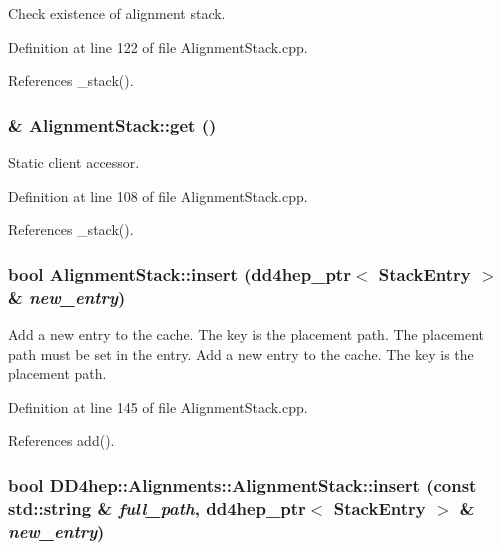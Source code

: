 Check existence of alignment stack. 

Definition at line 122 of file AlignmentStack.cpp.

References \_\-stack().\hypertarget{class_d_d4hep_1_1_alignments_1_1_alignment_stack_aa39f02a46ed00baec0b3a09e42e3af1c}{
\subsubsection[{get}]{ \& AlignmentStack::get ()}}
\label{class_d_d4hep_1_1_alignments_1_1_alignment_stack_aa39f02a46ed00baec0b3a09e42e3af1c}


Static client accessor. 

Definition at line 108 of file AlignmentStack.cpp.

References \_\-stack().\hypertarget{class_d_d4hep_1_1_alignments_1_1_alignment_stack_aefce20c233a0ad85d6a5c54ac2fb43b7}{
\subsubsection[{insert}]{\setlength{\rightskip}{0pt plus 5cm}bool AlignmentStack::insert ({\bf dd4hep\_\-ptr}$<$ {\bf StackEntry} $>$ \& {\em new\_\-entry})}}
\label{class_d_d4hep_1_1_alignments_1_1_alignment_stack_aefce20c233a0ad85d6a5c54ac2fb43b7}


Add a new entry to the cache. The key is the placement path. The placement path must be set in the entry. Add a new entry to the cache. The key is the placement path. 

Definition at line 145 of file AlignmentStack.cpp.

References add().\hypertarget{class_d_d4hep_1_1_alignments_1_1_alignment_stack_a4525563586574e54ce55ced7feead363}{
\subsubsection[{insert}]{\setlength{\rightskip}{0pt plus 5cm}bool DD4hep::Alignments::AlignmentStack::insert (const std::string \& {\em full\_\-path}, \/  {\bf dd4hep\_\-ptr}$<$ {\bf StackEntry} $>$ \& {\em new\_\-entry})}}
\label{class_d_d4hep_1_1_alignments_1_1_alignment_stack_a4525563586574e54ce55ced7feead363}


